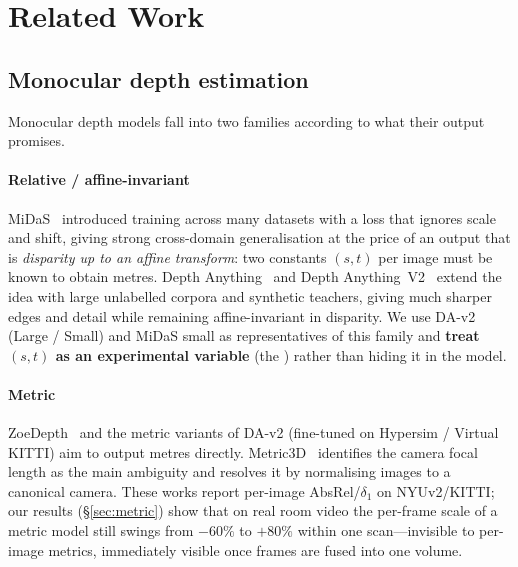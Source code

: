 \section{Related Work}\label{sec:related}

\subsection{Monocular depth estimation}
Monocular depth models fall into two families according to what their output promises.

\paragraph{Relative / affine-invariant} MiDaS~\cite{midas} introduced training across many datasets with a loss that
ignores scale and shift, giving strong cross-domain generalisation at the price of an output that is \emph{disparity up
to an affine transform}: two constants $(s, t)$ per image must be known to obtain metres. Depth Anything~\cite{da1}
and Depth Anything~V2~\cite{da2} extend the idea with large unlabelled corpora and synthetic teachers, giving much sharper
edges and detail while remaining affine-invariant in disparity. We use DA-v2 (Large / Small) and MiDaS small as
representatives of this family and \textbf{treat $(s,t)$ as an experimental variable} (the ) rather
than hiding it in the model.

\paragraph{Metric} ZoeDepth~\cite{zoedepth} and the metric variants of DA-v2 (fine-tuned on Hypersim / Virtual KITTI)
aim to output metres directly. Metric3D~\cite{metric3d} identifies the camera focal length as the main ambiguity and
resolves it by normalising images to a canonical camera. These works report per-image AbsRel/$\delta_1$ on NYUv2/KITTI;
our results (\S\ref{sec:metric}) show that on real room video the per-frame scale of a metric model still swings from
$-60\%$ to $+80\%$ within one scan---invisible to per-image metrics, immediately visible once frames are fused into one
volume.

